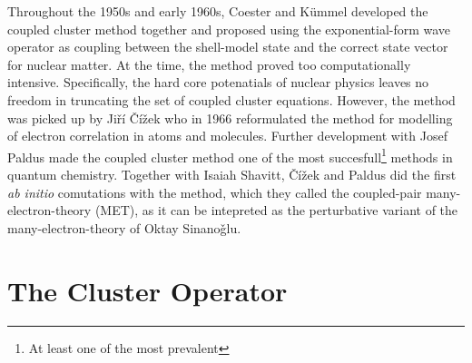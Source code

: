 Throughout the 1950s and early 1960s, Coester and Kümmel developed the coupled cluster method together and 
proposed using the exponential-form wave operator as coupling between the shell-model 
state and the correct state vector for nuclear matter\cite{coester1960short}. At the time, 
the method proved too computationally intensive. Specifically, the hard core potenatials 
of nuclear physics leaves no freedom in truncating the set of coupled cluster equations.
However, the method was picked up by 
Ji\v{r}\'{i} \v{C}\'{i}\v{z}ek who 
in 1966 reformulated the method for modelling of electron correlation in atoms and
molecules\cite{vcivzek1966correlation}. Further development with Josef Paldus
made the coupled cluster method one of the most succesfull\footnote{At least one of the
most prevalent} methods in quantum chemistry. Together with Isaiah Shavitt,
\v{C}\'{i}\v{z}ek and Paldus did the first \emph{ab initio} comutations with the method,
which they called the coupled-pair many-electron-theory (MET)\cite{paldus1972correlation},
as it can be intepreted as the perturbative variant of the many-electron-theory of 
Oktay Sinano\v{g}lu\cite{sinanoglu1964many}.

\section{The Cluster Operator}

